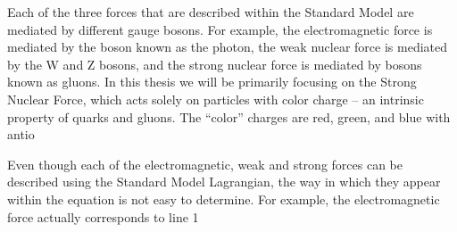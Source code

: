 Each of the three forces that are described within the Standard Model are mediated by different gauge bosons. For example, the electromagnetic force is mediated by the boson known as the photon, the weak nuclear force is mediated by the W and Z bosons, and the strong nuclear force is mediated by bosons known as gluons. 
In this thesis we will be primarily focusing on the Strong Nuclear Force, which acts solely on particles with color charge -- an intrinsic property of quarks and gluons. 
The ``color'' charges are red, green, and blue with antio

Even though each of the electromagnetic, weak and strong forces can be described using the Standard Model Lagrangian, the way in which they appear within the equation is not easy to determine.
For example, the electromagnetic force actually corresponds to line 1